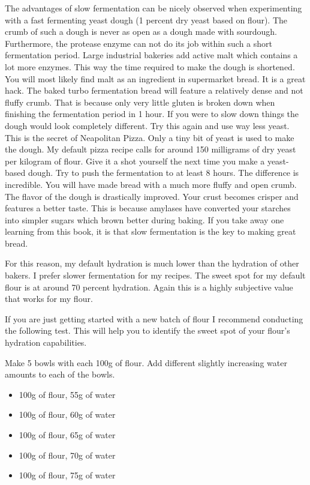 The advantages of slow fermentation can be nicely observed when experimenting
with a fast fermenting yeast dough (1 percent dry yeast based on flour). The
crumb of such a dough is never as
open as a dough made with sourdough. Furthermore, the protease enzyme
can not do its job within such a short fermentation period.
Large industrial bakeries add active malt which contains a
lot more enzymes. This way the time required to make the dough is shortened. You
will most likely find malt as an ingredient in supermarket bread. It is a
great hack. The baked turbo fermentation bread will feature a relatively dense
and not fluffy crumb. That is because only very little gluten is broken down when
finishing the fermentation period in 1 hour. If you were to slow down things
the dough would look completely different.
Try this again and use way less yeast. This is the
secret of Neapolitan Pizza. Only a tiny bit of yeast is used to make the
dough. My default pizza recipe calls for around 150 milligrams of dry
yeast per kilogram of flour. Give it a shot yourself the next time you
make a yeast-based dough. Try to push the fermentation to at least 8 hours.
The difference is incredible. You will have made bread with a much more
fluffy and open crumb. The flavor of the dough is drastically improved. Your
crust becomes crisper and features a better taste. This is because amylases have
converted your starches into simpler sugars which brown better during baking.
If you take away one learning from this book, it is that slow fermentation is
the key to making great bread.

For this reason, my default hydration is much lower than the hydration of other
bakers. I prefer slower fermentation for my recipes.
The sweet spot for my default flour is at around 70 percent hydration.
Again this is a highly subjective value that works for my flour.

If you are just getting started with a new batch of flour
I recommend conducting the following test. This will help you to
identify the sweet spot of your flour's hydration capabilities.

Make 5 bowls with each 100g of flour. Add different slightly increasing
water amounts to each of the bowls.

\begin{itemize}
  \item 100g of flour, 55g of water
  \item 100g of flour, 60g of water
  \item 100g of flour, 65g of water
  \item 100g of flour, 70g of water
  \item 100g of flour, 75g of water
\end{itemize}

